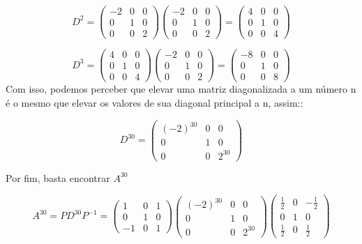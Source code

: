 \begin{enumerate}
	$$
	D^2 = 
	\begin{pmatrix}
		-2 & 0 & 0\\
		0 & 1 & 0\\
		0 & 0 & 2
	\end{pmatrix}
	\begin{pmatrix}
		-2 & 0 & 0\\
		0 & 1 & 0\\
		0 & 0 & 2
	\end{pmatrix}
	=
	\begin{pmatrix}
		4 & 0 & 0\\
		0 & 1 & 0\\
		0 & 0 & 4
	\end{pmatrix}	
	$$
	
	$$
	D^3 = 
	\begin{pmatrix}
		4 & 0 & 0\\
		0 & 1 & 0\\
		0 & 0 & 4
	\end{pmatrix}
	\begin{pmatrix}
		-2 & 0 & 0\\
		0 & 1 & 0\\
		0 & 0 & 2
	\end{pmatrix}
	=
	\begin{pmatrix}
		-8 & 0 & 0\\
		0 & 1 & 0\\
		0 & 0 & 8
	\end{pmatrix}	
	$$
	Com isso, podemos perceber que elevar uma matriz diagonalizada
	a um número n é o mesmo que elevar os valores de sua diagonal
	principal a n, assim::
	
	$$
	D^{30} = 
	\begin{pmatrix}
		(-2)^{30} & 0 & 0\\
		0 & 1 & 0\\
		0 & 0 & 2^{30}
	\end{pmatrix}$$
	
	Por fim, basta encontrar $A^{30}$
	
	$$
	A^{30} = PD^{30}P^{-1}
	=
	\begin{pmatrix}
		1 & 0 & 1\\
		0 & 1 & 0 \\
		-1 & 0 & 1 
	\end{pmatrix}
	\begin{pmatrix}
		(-2)^{30} & 0 & 0\\
		0 & 1 & 0\\
		0 & 0 & 2^{30}
	\end{pmatrix}
	\begin{pmatrix}
		\frac{1}{2} & 0 & -\frac{1}{2}\\
		0 & 1 & 0\\
		\frac{1}{2} & 0 & \frac{1}{2}
	\end{pmatrix}
	$$
	

\end{enumerate}
